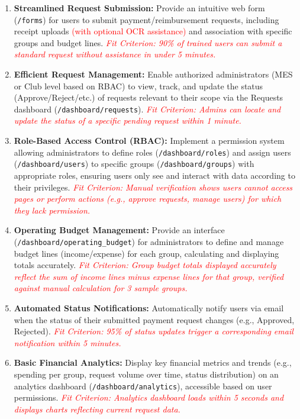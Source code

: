 \documentclass{article}
\begin{document}
\begin{enumerate}
    \item \textbf{Streamlined Request Submission:} Provide an intuitive web form (\texttt{/forms}) for users to submit payment/reimbursement requests, including receipt uploads \textcolor{red}{(with optional OCR assistance)} and association with specific groups and budget lines. \textit{\textcolor{red}{Fit Criterion: 90\% of trained users can submit a standard request without assistance in under 5 minutes.}} %
    \item \textbf{Efficient Request Management:} Enable authorized administrators (MES or Club level based on RBAC) to view, track, and update the status (Approve/Reject/etc.) of requests relevant to their scope via the Requests dashboard (\texttt{/dashboard/requests}). \textit{\textcolor{red}{Fit Criterion: Admins can locate and update the status of a specific pending request within 1 minute.}}
    \item \textbf{Role-Based Access Control (RBAC):} Implement a permission system allowing administrators to define roles (\texttt{/dashboard/roles}) and assign users (\texttt{/dashboard/users}) to specific groups (\texttt{/dashboard/groups}) with appropriate roles, ensuring users only see and interact with data according to their privileges. \textit{\textcolor{red}{Fit Criterion: Manual verification shows users cannot access pages or perform actions (e.g., approve requests, manage users) for which they lack permission.}}
    \item \textbf{Operating Budget Management:} Provide an interface (\texttt{/dashboard/operating\_budget}) for administrators to define and manage budget lines (income/expense) for each group, calculating and displaying totals accurately. \textit{\textcolor{red}{Fit Criterion: Group budget totals displayed accurately reflect the sum of income lines minus expense lines for that group, verified against manual calculation for 3 sample groups.}}
    \item \textbf{Automated Status Notifications:} Automatically notify users via email when the status of their submitted payment request changes (e.g., Approved, Rejected). \textit{\textcolor{red}{Fit Criterion: 95\% of status updates trigger a corresponding email notification within 5 minutes.}} %
    \item \textbf{Basic Financial Analytics:} Display key financial metrics and trends (e.g., spending per group, request volume over time, status distribution) on an analytics dashboard (\texttt{/dashboard/analytics}), accessible based on user permissions. \textit{\textcolor{red}{Fit Criterion: Analytics dashboard loads within 5 seconds and displays charts reflecting current request data.}}
\end{enumerate}
\end{document}
